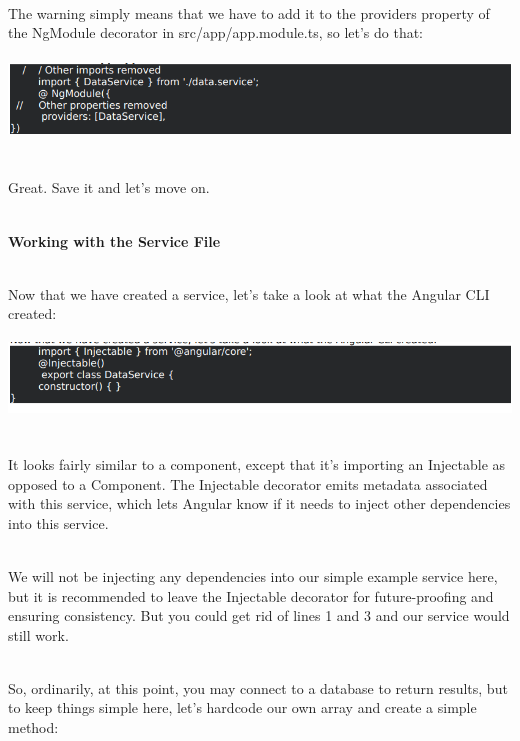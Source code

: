 \documentclass{article}
\begin{document}
\noindent \\ The warning simply means that we have to add it to the providers property of the NgModule decorator in src/app/app.module.ts, so let's do that:

\begin{center}
	\noindent  \includegraphics*[width=6.25in, height=0.87in]{IMG-05-05}
\end{center}

\noindent 

\noindent \\ Great. Save it and let's move on.

\noindent 
\newpage
\noindent \\ \textbf{Working with the Service File}

\noindent \\ Now that we have created a service, let's take a look at what the Angular CLI created:

\begin{center}
	\noindent \includegraphics*[width=6.25in, height=0.82in, trim=0.00in 0.00in 0.00in 0.06in]{IMG-05-06}
\end{center}

\noindent \\ It looks fairly similar to a component, except that it's importing an Injectable as opposed to a Component. The Injectable decorator emits metadata associated with this service, which lets Angular know if it needs to inject other dependencies into this service.

\noindent 

\noindent \\ We will not be injecting any dependencies into our simple example service here, but it is recommended to leave the Injectable decorator for future-proofing and ensuring consistency. But you could get rid of lines 1 and 3 and our service would still work.

\noindent 

\noindent \\ So, ordinarily, at this point, you may connect to a database to return results, but to keep things simple here, let's hardcode our own array and create a simple method:
\end{document}
